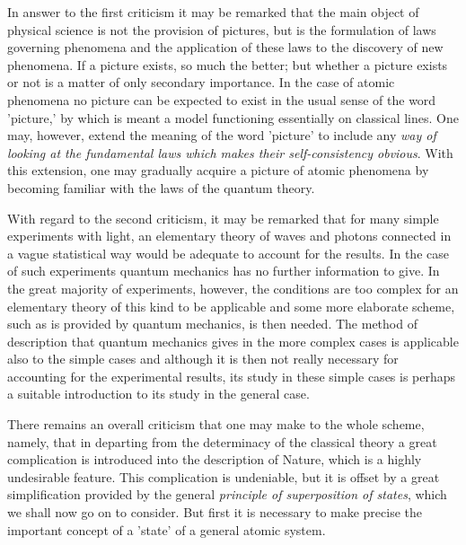 In answer to the first criticism it may be remarked that the main object of physical science is not the provision of pictures, but is the formulation of laws governing phenomena and the application of these laws to the discovery of new phenomena.  If a picture exists, so much the better; but whether a picture exists or not is a matter of only secondary importance.  In the case of atomic phenomena no picture can be expected to exist in the usual sense of the word 'picture,' by which is meant a model functioning essentially on classical lines.  One may, however, extend the meaning of the word 'picture' to include any \emph{way of looking at the fundamental laws which makes their self-consistency obvious}.  With this extension, one may gradually acquire a picture of atomic phenomena by becoming familiar with the laws of the quantum theory.

With regard to the second criticism, it may be remarked that for many simple experiments with light, an elementary theory of waves and photons connected in a vague statistical way would be adequate to account for the results.  In the case of such experiments quantum mechanics has no further information to give.  In the great majority of experiments, however, the conditions are too complex for an elementary theory of this kind to be applicable and some more elaborate scheme, such as is provided by quantum mechanics, is then needed.  The method of description that quantum mechanics gives in the more complex cases is applicable also to the simple cases and although it is then not really necessary for accounting for the experimental results, its study in these simple cases is perhaps a suitable introduction to its study in the general case.

There remains an overall criticism that one may make to the whole scheme, namely, that in departing from the determinacy of the classical theory a great complication is introduced into the description of Nature, which is a highly undesirable feature.  This complication is undeniable, but it is offset by a great simplification provided by the general \emph{principle of superposition of states}, which we shall now go on to consider.  But first it is necessary to make precise the important concept of a 'state' of a general atomic system.

